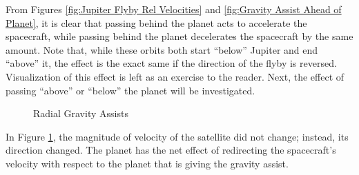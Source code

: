 \documentclass[../basicOrbitalDynamics.tex]{subfiles}
\begin{document}
From Figures \ref{fig:Jupiter Flyby Rel Velocities} and \ref{fig:Gravity Assist Ahead of Planet}, it is clear that passing behind the planet acts to accelerate the spacecraft, while passing behind the planet decelerates the spacecraft by the same amount. Note that, while these orbits both start ``below'' Jupiter and end ``above'' it, the effect is the exact same if the direction of the flyby is reversed. Visualization of this effect is left as an exercise to the reader. Next, the effect of passing ``above'' or ``below'' the planet will be investigated.

\begin{figure}[H]
    \centering
    \caption{Radial Gravity Assists}\label{fig:Gravity assists above/below}
\end{figure}

In Figure \ref{fig:Gravity assists above/below}, the magnitude of velocity of the satellite did not change; instead, its direction changed. The planet has the net effect of redirecting the spacecraft's velocity with respect to the planet that is giving the gravity assist.
\end{document}
